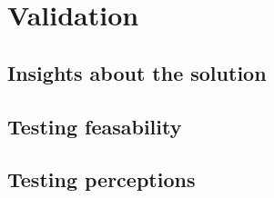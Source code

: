 

\chapter{Validation}

\label{Chapter4} %


\section{Insights about the solution}


\section{Testing feasability}


\section{Testing perceptions}